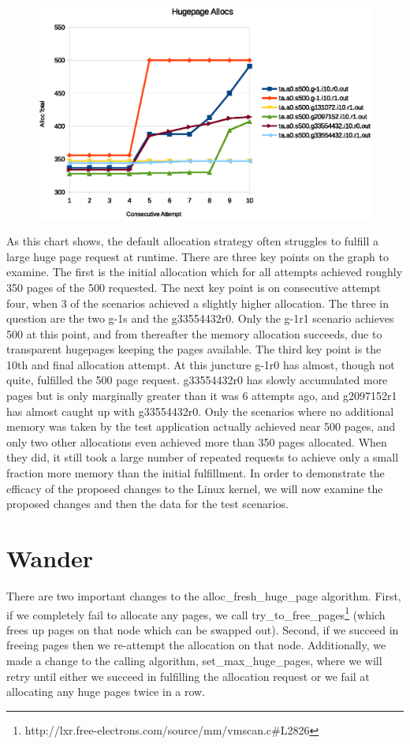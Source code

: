 \documentclass{article}
\begin{document}
\begin{figure}[h!]
	\includegraphics[width=\linewidth]{./datums/default_alloc.eps}
	\label{fig:default_alloc}
\end{figure}

As this chart shows, the default allocation strategy often struggles to fulfill a large huge page request at runtime. There are three key points on the graph to examine. The first is the initial allocation which for all attempts achieved roughly 350 pages of the 500 requested. The next key point is on consecutive attempt four, when 3 of the scenarios achieved a slightly higher allocation. The three in question are the two g-1s and the g33554432r0. Only the g-1r1 scenario achieves 500 at this point, and from thereafter the memory allocation succeeds, due to transparent hugepages keeping the pages available. The third key point is the 10th and final allocation attempt. At this juncture g-1r0 has almost, though not quite, fulfilled the 500 page request. g33554432r0 has slowly accumulated more pages but is only marginally greater than it was 6 attempts ago, and g2097152r1 has almost caught up with g33554432r0. Only the scenarios where no additional memory was taken by the test application actually achieved near 500 pages, and only two other allocations even achieved more than 350 pages allocated. When they did, it still took a large number of repeated requests to achieve only a small fraction more memory than the initial fulfillment. In order to demonstrate the efficacy of the proposed changes to the Linux kernel, we will now examine the proposed changes and then the data for the test scenarios.

\section{Wander}
There are two important changes to the alloc\_fresh\_huge\_page algorithm. First, if we completely fail to allocate any pages, we call try\_to\_free\_pages\footnote{http://lxr.free-electrons.com/source/mm/vmscan.c#L2826} (which frees up pages on that node which can be swapped out). Second, if we succeed in freeing pages then we re-attempt the allocation on that node. Additionally, we made a change to the calling algorithm, set\_max\_huge\_pages, where we will retry until either we succeed in fulfilling the allocation request or we fail at allocating any huge pages twice in a row.
\end{document}
